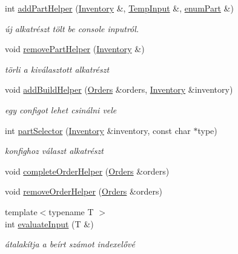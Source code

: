 \begin{DoxyCompactItemize}
int \mbox{\hyperlink{_menu_8h_a369084a71ee372ce9e1096d887a53e77}{add\+Part\+Helper}} (\mbox{\hyperlink{class_inventory}{Inventory}} \&, \mbox{\hyperlink{struct_temp_input}{Temp\+Input}} \&, \mbox{\hyperlink{_parts_8h_abddff37837f171d72a2e16a1448a3943}{enum\+Part}} \&)
\begin{DoxyCompactList}\small\item\em új alkatrészt tölt be console inputról. \end{DoxyCompactList}\item 
void \mbox{\hyperlink{_menu_8h_af332548b8c7c1e4d477c95abf6233b5d}{remove\+Part\+Helper}} (\mbox{\hyperlink{class_inventory}{Inventory}} \&)
\begin{DoxyCompactList}\small\item\em törli a kiválasztott alkatrészt \end{DoxyCompactList}\item 
void \mbox{\hyperlink{_menu_8h_a185a985b9e28ccd13d5fb2d841e4a5f0}{add\+Build\+Helper}} (\mbox{\hyperlink{class_orders}{Orders}} \&orders, \mbox{\hyperlink{class_inventory}{Inventory}} \&inventory)
\begin{DoxyCompactList}\small\item\em egy configot lehet csinálni vele \end{DoxyCompactList}\item 
int \mbox{\hyperlink{_menu_8h_aa66bedcbb6a6b03cde60b3441e6ae031}{part\+Selector}} (\mbox{\hyperlink{class_inventory}{Inventory}} \&inventory, const char $\ast$type)
\begin{DoxyCompactList}\small\item\em konfighoz választ alkatrészt \end{DoxyCompactList}\item 
void \mbox{\hyperlink{_menu_8h_a0f808ec53d26f8bcef1a0f22783c78f8}{complete\+Order\+Helper}} (\mbox{\hyperlink{class_orders}{Orders}} \&orders)
\item 
void \mbox{\hyperlink{_menu_8h_aed744d8c7e74c041565714ecfb656f0b}{remove\+Order\+Helper}} (\mbox{\hyperlink{class_orders}{Orders}} \&orders)
\item 
{\footnotesize template$<$typename T $>$ }\\int \mbox{\hyperlink{_menu_8h_a849fbf52d43e574e121662054591db87}{evaluate\+Input}} (T \&)
\begin{DoxyCompactList}\small\item\em átalakítja a beírt számot indexelővé \end{DoxyCompactList}\item 

\end{DoxyCompactItemize}
